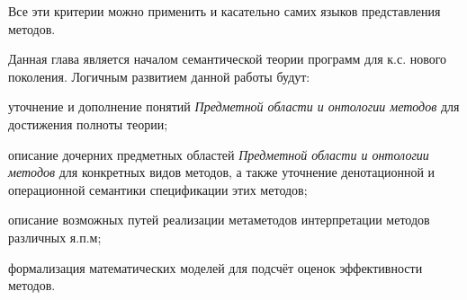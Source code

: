 Все эти критерии можно применить и касательно самих языков представления методов.

Данная глава является началом семантической теории программ для к.с. нового поколения. Логичным развитием данной работы будут:

\begin{textitemize}
    \item уточнение и дополнение понятий \textit{Предметной области и онтологии методов} для достижения полноты теории;
    \item описание дочерних предметных областей \textit{Предметной области и онтологии методов} для конкретных видов методов, а также уточнение денотационной и операционной семантики спецификации этих методов;
    \item описание возможных путей реализации метаметодов интерпретации методов различных я.п.м;
    \item формализация математических моделей для подсчёт оценок эффективности методов.
\end{textitemize}
